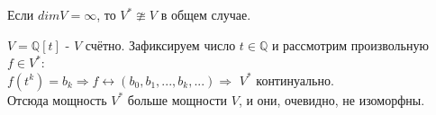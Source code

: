     \begin{remark}
        Если $dim V = \infty$, то $V^{*} \ncong V$ в общем случае.
    \end{remark}
    \begin{example1}
        $V = \mathbb{Q}[t]$ - $V$ счётно. Зафиксируем число $t\in \mathbb{Q}$ и рассмотрим произвольную $f \in V^{*}$:\\ 
        $f(t^k) = b_k \Rightarrow f \leftrightarrow (b_0, b_1,..., b_k,...) \Rightarrow$ $V^{*}$ континуально.\\
        Отсюда мощность $V^{*}$ больше мощности $V$, и они, очевидно, не изоморфны.
    \end{example1}
